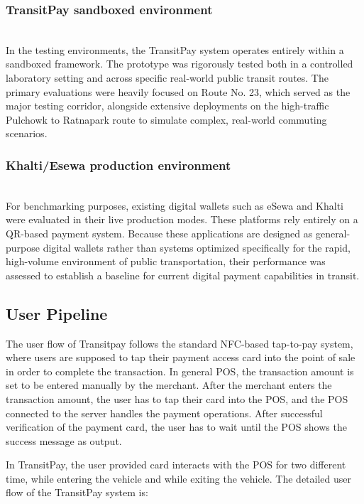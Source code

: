\documentclass[manuscript,review,anonymous]{acmart}
\begin{document}
\subsubsection{TransitPay sandboxed environment} \mbox{} \\
In the testing environments, the TransitPay system operates entirely within a sandboxed framework. The prototype was rigorously tested both in a controlled laboratory setting and across specific real-world public transit routes. The primary evaluations were heavily focused on Route No. 23, which served as the major testing corridor, alongside extensive deployments on the high-traffic Pulchowk to Ratnapark route to simulate complex, real-world commuting scenarios.

\subsubsection{Khalti/Esewa production environment} \mbox{} \\
For benchmarking purposes, existing digital wallets such as eSewa and Khalti were evaluated in their live production modes. These platforms rely entirely on a QR-based payment system. Because these applications are designed as general-purpose digital wallets rather than systems optimized specifically for the rapid, high-volume environment of public transportation, their performance was assessed to establish a baseline for current digital payment capabilities in transit.




\subsection{User Pipeline}
The user flow of Transitpay follows the standard NFC-based tap-to-pay system, where users are supposed to tap their payment access card into the point of sale in order to complete the transaction. In general POS, the transaction amount is set to be entered manually by the merchant. After the merchant enters the transaction amount, the user has to tap their card into the POS, and the POS connected to the server handles the payment operations. After successful verification of the payment card, the user has to wait until the POS shows the success message as output.

In TransitPay, the user provided card interacts with the POS for two different time, while entering the vehicle and while exiting the vehicle. The detailed user flow of the TransitPay system is:
\end{document}
